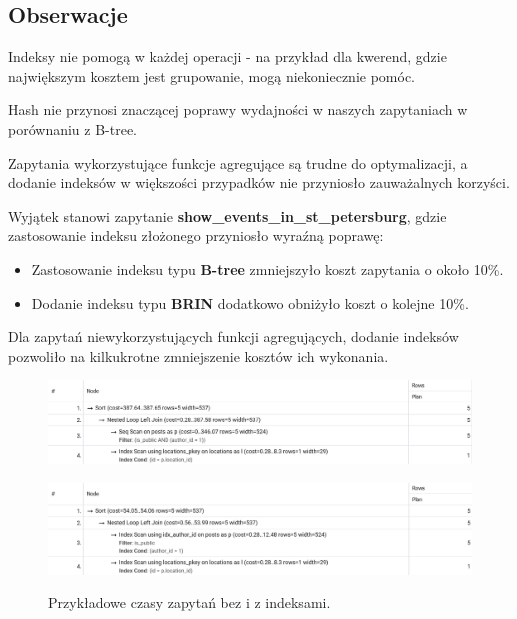 \documentclass{article}
\begin{document}
\newpage

\subsection{Obserwacje}

Indeksy nie pomogą w każdej operacji - na przykład dla kwerend, gdzie największym kosztem jest grupowanie, mogą niekoniecznie pomóc.

Hash nie przynosi znaczącej poprawy wydajności w naszych zapytaniach w porównaniu z B-tree.

Zapytania wykorzystujące funkcje agregujące są trudne do optymalizacji, a dodanie indeksów w większości przypadków nie przyniosło zauważalnych korzyści.

Wyjątek stanowi zapytanie \textbf{show\_events\_in\_st\_petersburg}, gdzie zastosowanie indeksu złożonego przyniosło wyraźną poprawę:
\begin{itemize}
    \item Zastosowanie indeksu typu \textbf{B-tree} zmniejszyło koszt zapytania o około 10\%.
    \item Dodanie indeksu typu \textbf{BRIN} dodatkowo obniżyło koszt o kolejne 10\%.
\end{itemize}

Dla zapytań niewykorzystujących funkcji agregujących, dodanie indeksów pozwoliło na kilkukrotne zmniejszenie kosztów ich wykonania.


\begin{figure}[htbp]
    \centering
    \begin{minipage}{0.45\textwidth}
        \centering
        \includegraphics[width=\linewidth]{images/index_show_authors_posts_before.png}
        \label{fig:index_show_authors_posts_before}
    \end{minipage}
    \hfill
    \begin{minipage}{0.45\textwidth}
        \centering
        \includegraphics[width=\linewidth]{images/index_show_authors_posts_after.png}
        \label{fig:index_show_authors_posts_after}
    \end{minipage}
    \caption{Przykładowe czasy zapytań bez i z indeksami.}
\end{figure}
\end{document}
